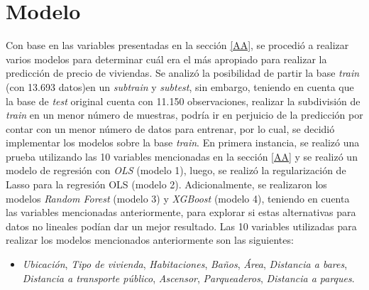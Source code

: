 \documentclass[conference, 10pt]{IEEEtran}
\begin{document}
\section{Modelo}
Con base en las variables presentadas en la sección \ref{AA}, se procedió a realizar varios modelos para determinar cuál era el más apropiado para realizar la predicción de precio de viviendas. Se analizó la posibilidad de partir la base \textit{train} (con 13.693 datos)en un \textit{subtrain} y \textit{subtest}, sin embargo, teniendo en cuenta que la base de \textit{test} original cuenta con 11.150 observaciones, realizar la subdivisión de \textit{train} en un menor número de muestras, podría ir en perjuicio de la predicción por contar con un menor número de datos para entrenar, por lo cual, se decidió implementar los modelos sobre la base \textit{train}. En primera instancia, se realizó una prueba utilizando las 10 variables mencionadas en la sección \ref{AA} y se realizó un modelo de regresión con \textit{OLS} (modelo 1), luego, se realizó la regularización de Lasso para la regresión OLS (modelo 2). Adicionalmente, se realizaron los modelos \textit{Random Forest} (modelo 3) y \textit{XGBoost} (modelo 4), teniendo en cuenta las variables mencionadas anteriormente, para explorar si estas alternativas para datos no lineales podían dar un mejor resultado. Las 10 variables utilizadas para realizar los modelos mencionados anteriormente son las siguientes: 
\begin{itemize}
\item \textit{Ubicación}, \textit{Tipo de vivienda}, \textit{Habitaciones}, \textit{Baños}, \textit{Área}, \textit{Distancia a bares}, \textit{Distancia a transporte público}, \textit{Ascensor}, \textit{Parqueaderos}, \textit{Distancia a parques}.  
\end{itemize}
\end{document}
